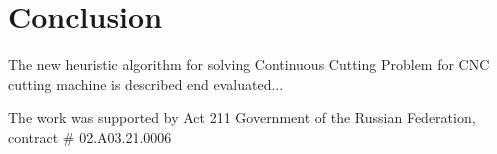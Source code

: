 \documentclass{ifacconf}
\begin{document}
\section{Conclusion}

The new heuristic algorithm
for solving
Continuous Cutting Problem
for CNC cutting machine
is described end evaluated...

\begin{ack}
The work was supported by Act 211 Government of the Russian Federation,
contract \# 02.A03.21.0006
\end{ack}

\end{document}
